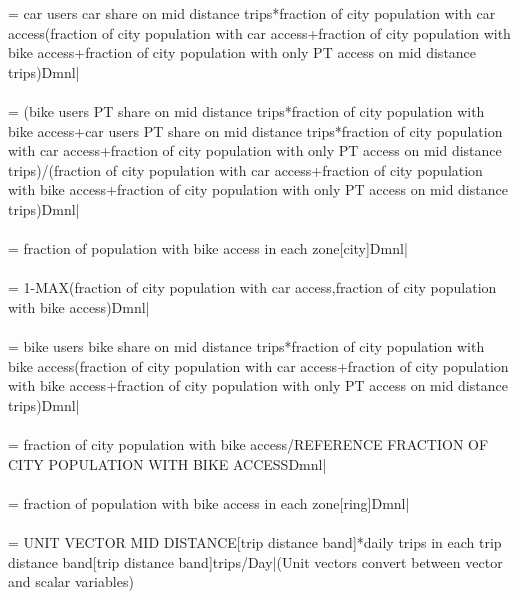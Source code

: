  = {\small car users car share on mid distance trips*fraction of city population with car access\/(fraction of city population with car access+fraction of city population with bike access+fraction of city population with only PT access on mid distance trips)Dmnl|} \\ \\ 
 = {\small (bike users PT share on mid distance trips*fraction of city population with bike access+car users PT share on mid distance trips*fraction of city population with car access+fraction of city population with only PT access on mid distance trips)/(fraction of city population with car access+fraction of city population with bike access+fraction of city population with only PT access on mid distance trips)Dmnl|} \\ \\ 
 = {\small fraction of population with bike access in each zone[city]Dmnl|} \\ \\ 
 = {\small 1-MAX(fraction of city population with car access,fraction of city population with bike access)Dmnl|} \\ \\ 
 = {\small bike users bike share on mid distance trips*fraction of city population with bike access\/(fraction of city population with car access+fraction of city population with bike access+fraction of city population with only PT access on mid distance trips)Dmnl|} \\ \\ 
 = {\small fraction of city population with bike access/REFERENCE FRACTION OF CITY POPULATION WITH BIKE ACCESSDmnl|} \\ \\ 
 = {\small fraction of population with bike access in each zone[ring]Dmnl|} \\ \\ 
 = {\small UNIT VECTOR MID DISTANCE[trip distance band]*daily trips in each trip distance band[trip distance band]trips/Day|}{\small  (Unit vectors convert between vector and scalar variables)} \\ \\ 
